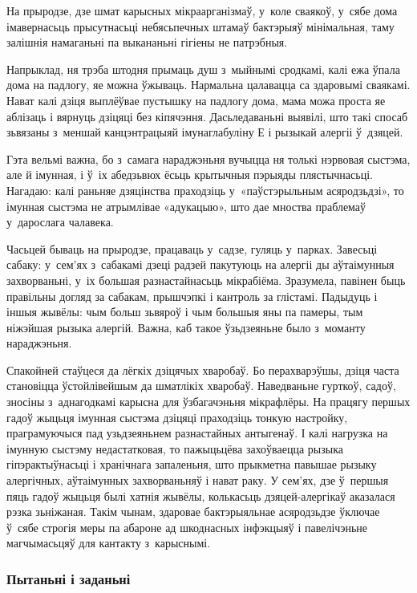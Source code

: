 На прыродзе, дзе шмат карысных мікраарганізмаў, у~коле сваякоў, у~сябе дома імавернасьць прысутнасьці небясьпечных штамаў бактэрыяў мінімальная, таму залішнія намаганьні па выкананьні гігіены не патрэбныя.

Напрыклад, ня трэба штодня прымаць душ з~мыйнымі сродкамі, калі ежа ўпала дома на падлогу, яе можна ўжываць. Нармальна цалавацца са здаровымі сваякамі. Нават калі дзіця выплёўвае пустышку на падлогу дома, мама можа проста яе аблізаць і вярнуць дзіцяці без кіпячэння. Дасьледаваньні выявілі, што такі спосаб зьвязаны з~меншай канцэнтрацыяй імунаглабуліну Е і рызыкай алергіі ў~дзяцей.

Гэта вельмі важна, бо з~самага нараджэньня вучыцца ня толькі нэрвовая сыстэма, але й імунная, і ў~іх абедзьвюх ёсьць крытычныя пэрыяды плястычнасьці. Нагадаю: калі раньняе дзяцінства праходзіць у~«паўстэрыльным асяродзьдзі», то імунная сыстэма не атрымлівае «адукацыю», што дае мноства праблемаў у~дарослага чалавека.

Часьцей бываць на прыродзе, працаваць у~садзе, гуляць у~парках. Завесьці сабаку: у~сем'ях з~сабакамі дзеці радзей пакутуюць на алергіі ды аўтаімунныя захворваньні, у~іх большая разнастайнасьць мікрабіёма. Зразумела, павінен быць правільны догляд за сабакам, прышчэпкі і кантроль за глістамі. Падыдуць і іншыя жывёлы: чым больш зьвяроў і чым большыя яны па памеры, тым ніжэйшая рызыка алергій. Важна, каб такое ўзьдзеяньне было з~моманту нараджэньня. 

Спакойней стаўцеся да лёгкіх дзіцячых хваробаў. Бо перахварэўшы, дзіця часта становіцца ўстойлівейшым да шматлікіх хваробаў. Наведваньне гурткоў, садоў, зносіны з~аднагодкамі карысна для ўзбагачэньня мікрафлёры. На працягу першых гадоў жыцьця імунная сыстэма дзіцяці праходзіць тонкую настройку, праграмуючыся пад узьдзеяньнем разнастайных антыгенаў. І калі нагрузка на імунную сыстэму недастатковая, то пажыцьцёва захоўваецца рызыка гіпэрактыўнасьці і хранічнага запаленьня, што прыкметна павышае рызыку алергічных, аўтаімунных захворваньняў і нават раку. У сем'ях, дзе ў~першыя пяць гадоў жыцьця былі хатнія жывёлы, колькасьць дзяцей-алергікаў аказалася рэзка зьніжаная. Такім чынам, здаровае бактэрыяльнае асяродзьдзе ўключае ў~сябе строгія меры па абароне ад шкоднасных інфэкцыяў і павелічэньне магчымасьцяў для кантакту з~карыснымі.

\subsubsection{Пытаньні і заданьні}

